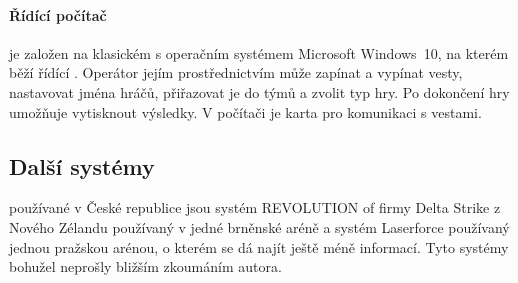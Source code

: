\paragraph{Řídící počítač}
je založen na klasickém  s operačním systémem Microsoft Windows~10, na kterém běží řídící . Operátor jejím prostřednictvím může zapínat a vypínat vesty, nastavovat jména hráčů, přiřazovat je do týmů a zvolit typ hry. Po dokončení hry umožňuje  vytisknout výsledky. V počítači je  karta pro komunikaci s vestami.


\subsection{Další systémy}
používané v České republice jsou systém REVOLUTION of firmy Delta Strike z Nového Zélandu používaný v jedné brněnské aréně a systém Laserforce používaný jednou pražskou arénou, o kterém se dá najít ještě méně informací. Tyto systémy bohužel neprošly bližším zkoumáním autora.
